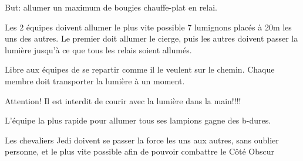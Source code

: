 \documentclass{grand-jeu}
\begin{document}
\begin{liste-materiel}
\end{liste-materiel}

\begin{regles}
But: allumer un maximum de bougies chauffe-plat en relai.

Les 2 équipes doivent allumer le plus vite possible 7 lumignons placés à 20m les uns des autres.
Le premier doit allumer le cierge, puis les autres doivent passer la lumière jusqu'à ce que tous les relais soient allumés.

Libre aux équipes de se repartir comme il le veulent sur le chemin. Chaque membre doit transporter la lumière à un moment. 

Attention! Il est interdit de courir avec la lumière dans la main!!!!

L'équipe la plus rapide pour allumer tous ses lampions gagne des b-dures. 
\end{regles}

\begin{imaginaire}
Les chevaliers Jedi doivent se passer la force les uns aux autres, sans oublier personne, et le plus vite possible afin de pouvoir combattre le Côté Obscur 
\end{imaginaire}

\begin{moments-stop}
\end{moments-stop}
\end{document}
